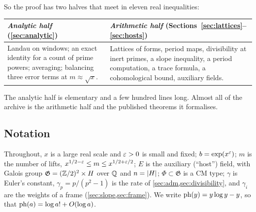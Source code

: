 So the proof has two halves that meet in eleven real inequalities:
\begin{center}
\begin{tabular}{@{}p{}@{\qquad}p{}@{}}
\toprule
\emph{Analytic half} (\cref{sec:analytic}) & \emph{Arithmetic half} (Sections~\ref{sec:lattices}--\ref{sec:hosts})\\
\midrule
Landau on windows; an exact identity for a count of prime powers; averaging; balancing three
error terms at $m\approx\sqrt x$.
&
Lattices of forms, period maps, divisibility at inert primes, a slope inequality, a period
computation, a trace formula, a cohomological bound, auxiliary fields.\\
\bottomrule
\end{tabular}
\end{center}
The analytic half is elementary and a few hundred lines long. Almost all of the archive is the
arithmetic half and the published theorems it formalises.

\subsection*{Notation}
Throughout, $x$ is a large real scale and $\varepsilon>0$ is small and fixed; $b=\exp(x^{\varepsilon})$;
$m$ is the number of lifts, $x^{1/2-\varepsilon}\le m\le x^{1/2+\varepsilon/2}$; $E$ is the auxiliary
(``host'') field, with Galois group $\mathfrak G=(\mathbb{Z}/2)^2\times H$ over $\mathbb{Q}$ and $n=\lvert H\rvert$;
$\Phi\subset\mathfrak G$ is a CM type; $\gamma$ is Euler's constant, $\gamma_p=p/(p^2-1)$ is
the rate of \cref{sec:adm,sec:divisibility}, and $\gamma_i$ are the weights of a frame
(\cref{sec:slope,sec:frame}). We write $\operatorname{ph}(y)=y\log y-y$, so
that $\operatorname{ph}(a)=\log a!+O(\log a)$.
